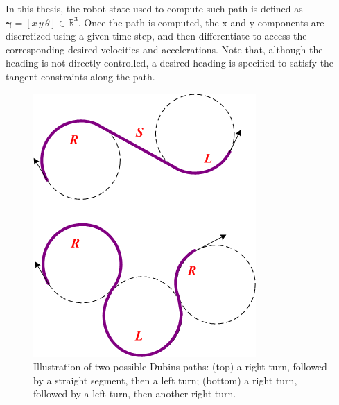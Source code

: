 In this thesis, the robot state used to compute such path is defined as $\boldsymbol{\gamma} = [x \, y \, \theta] \in \mathbb{R}^3$.
Once the path is computed, the x and y components are discretized using a given time step, and then differentiate to access the corresponding desired velocities and accelerations.
Note that, although the heading is not directly controlled, a desired heading is specified to satisfy the tangent constraints along the path.

\begin{figure} [t]
  \centering
  \includegraphics[width=0.4\linewidth]{figures/models/dubins.png} 
  \caption{Illustration of two possible Dubins paths: (top) a right turn, followed by a straight segment, then a left turn; (bottom) a right turn, followed by a left turn, then another right turn.}%
  \label{fig:dubins}%
\end{figure}